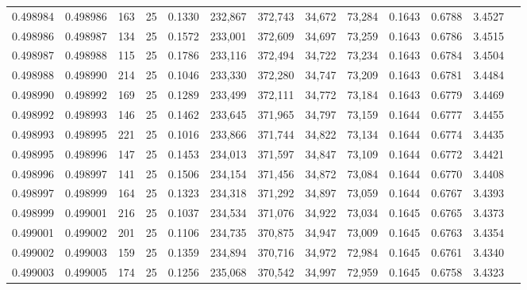 \begin{tabular}{rrrrrrrrrrrrr}
0.498984 & 0.498986 & 163 &  25 &                                     0.1330 & 232,867 & 372,743 &  34,672 &  73,284 & 0.1643 & 0.6788 & 3.4527 \\
0.498986 & 0.498987 & 134 &  25 &                                     0.1572 & 233,001 & 372,609 &  34,697 &  73,259 & 0.1643 & 0.6786 & 3.4515 \\
0.498987 & 0.498988 & 115 &  25 &                                     0.1786 & 233,116 & 372,494 &  34,722 &  73,234 & 0.1643 & 0.6784 & 3.4504 \\
0.498988 & 0.498990 & 214 &  25 &                                     0.1046 & 233,330 & 372,280 &  34,747 &  73,209 & 0.1643 & 0.6781 & 3.4484 \\
0.498990 & 0.498992 & 169 &  25 &                                     0.1289 & 233,499 & 372,111 &  34,772 &  73,184 & 0.1643 & 0.6779 & 3.4469 \\
0.498992 & 0.498993 & 146 &  25 &                                     0.1462 & 233,645 & 371,965 &  34,797 &  73,159 & 0.1644 & 0.6777 & 3.4455 \\
0.498993 & 0.498995 & 221 &  25 &                                     0.1016 & 233,866 & 371,744 &  34,822 &  73,134 & 0.1644 & 0.6774 & 3.4435 \\
0.498995 & 0.498996 & 147 &  25 &                                     0.1453 & 234,013 & 371,597 &  34,847 &  73,109 & 0.1644 & 0.6772 & 3.4421 \\
0.498996 & 0.498997 & 141 &  25 &                                     0.1506 & 234,154 & 371,456 &  34,872 &  73,084 & 0.1644 & 0.6770 & 3.4408 \\
0.498997 & 0.498999 & 164 &  25 &                                     0.1323 & 234,318 & 371,292 &  34,897 &  73,059 & 0.1644 & 0.6767 & 3.4393 \\
0.498999 & 0.499001 & 216 &  25 &                                     0.1037 & 234,534 & 371,076 &  34,922 &  73,034 & 0.1645 & 0.6765 & 3.4373 \\
0.499001 & 0.499002 & 201 &  25 &                                     0.1106 & 234,735 & 370,875 &  34,947 &  73,009 & 0.1645 & 0.6763 & 3.4354 \\
0.499002 & 0.499003 & 159 &  25 &                                     0.1359 & 234,894 & 370,716 &  34,972 &  72,984 & 0.1645 & 0.6761 & 3.4340 \\
0.499003 & 0.499005 & 174 &  25 &                                     0.1256 & 235,068 & 370,542 &  34,997 &  72,959 & 0.1645 & 0.6758 & 3.4323 \\

\end{tabular}
